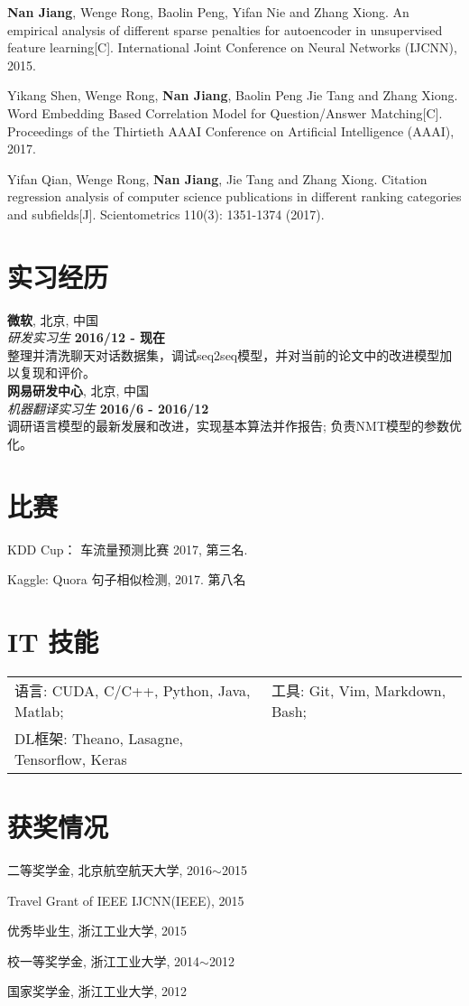 \documentclass[margin,line]{resume}
\begin{document}
\begin{resume}
\textbf{Nan Jiang}, Wenge Rong, Baolin Peng, Yifan Nie and Zhang Xiong. An empirical analysis of different sparse penalties for autoencoder in unsupervised feature learning[C]. International Joint Conference on Neural Networks (IJCNN), 2015.

Yikang Shen, Wenge Rong, \textbf{Nan Jiang}, Baolin Peng Jie Tang and Zhang Xiong. Word Embedding Based Correlation Model for Question/Answer Matching[C]. Proceedings of the Thirtieth {AAAI} Conference on Artificial Intelligence (AAAI), 2017.

Yifan Qian, Wenge Rong, \textbf{Nan Jiang}, Jie Tang and Zhang Xiong. Citation regression analysis of computer science publications in different ranking categories and subfields[J]. Scientometrics 110(3): 1351-1374 (2017).




\section{实习经历}
{\bf 微软}, 北京, 中国 \\
{\em 研发实习生} \hfill {\bf  2016/12 - 现在}\\
整理并清洗聊天对话数据集，调试seq2seq模型，并对当前的论文中的改进模型加以复现和评价。\\

{\bf 网易研发中心}, 北京, 中国 \\
{\em 机器翻译实习生} \hfill {\bf  2016/6 - 2016/12}\\
调研语言模型的最新发展和改进，实现基本算法并作报告; 负责NMT模型的参数优化。\\




\section{比赛}
KDD Cup： 车流量预测比赛 2017, 第三名.

Kaggle: Quora 句子相似检测, 2017. 第八名


\section{IT 技能}
\begin{tabular}{@{}p{3in}p{3in}}
语言: CUDA, C/C++, Python, Java, Matlab;& 工具: Git, Vim, Markdown, Bash; \\
DL框架: Theano, Lasagne, Tensorflow, Keras  &  \\
\end{tabular}



\section{获奖情况}
二等奖学金, 北京航空航天大学, 2016$\sim$2015

Travel Grant of IEEE IJCNN(IEEE), 2015

优秀毕业生, 浙江工业大学, 2015

校一等奖学金, 浙江工业大学, 2014$\sim$2012

国家奖学金, 浙江工业大学, 2012


\end{resume}
\end{document}

